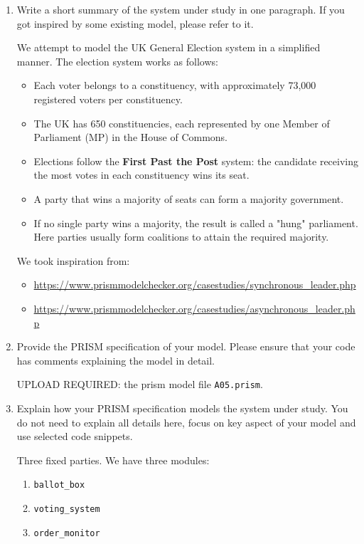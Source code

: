 \documentclass[12pt,a4paper]{article}
\begin{document}
\begin{enumerate}

\item Write a short summary of the system under study in one paragraph. If you got inspired by some existing model, please refer to it. 
%
\ifwithanswers
\color{blue}

\par   We attempt to model the UK General Election system in a simplified manner. The election system works as follows:
\begin{itemize}
    \item Each voter belongs to a constituency, with approximately 73,000 registered voters per constituency.
    \item The UK has 650 constituencies, each represented by one Member of Parliament (MP) in the House of Commons.
    \item Elections follow the \textbf{First Past the Post} system: the candidate receiving the most votes in each constituency wins its seat.
    \item A party that wins a majority of seats can form a majority government.
    \item If no single party wins a majority, the result is called a "hung" parliament. Here parties usually form coalitions to attain the required majority.
\end{itemize}


We took inspiration from: 
\begin{itemize}
\item \url{https://www.prismmodelchecker.org/casestudies/synchronous_leader.php}
\item \url{https://www.prismmodelchecker.org/casestudies/asynchronous_leader.php}
\end{itemize}

\color{black}
\fi
%
\item Provide the PRISM specification of your model. Please ensure that your code has comments explaining the model in detail. 
\color{red} \par UPLOAD REQUIRED: the prism model file \texttt{A05.prism}.
\color{black}
%
\ifwithanswers
\color{blue}
\color{black}
\fi
%
\item Explain how your PRISM specification models the system under study. You do not need to explain all details here, focus on key aspect of your model and use selected code snippets. 
%
\ifwithanswers
\color{blue}
\par
Three fixed parties.
We have three modules:
\begin{enumerate}
    \item \texttt{ballot\_box}
    \item \texttt{voting\_system}
    \item \texttt{order\_monitor}
\end{enumerate}


\end{enumerate}
\end{document}
